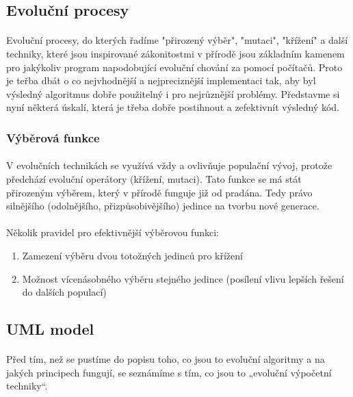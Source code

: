 \documentclass[bc,male,java,dept460]{diploma}		%
\begin{document}
\subsection{Evoluční procesy}
\paragraph*{}
Evoluční procesy, do kterých řadíme "přirozený výběr", "mutaci", "křížení" a další techniky, které jsou inspirované zákonitostmi v přírodě jsou základním kamenem pro jakýkoliv program napodobující evoluční chování za pomocí počítačů. Proto je teřba dbát o co nejvhodnější a nejpreciznější implementaci tak, aby byl výsledný algoritmus dobře použitelný i pro nejrůznější problémy. Představme si nyní některá úskalí, která je třeba dobře postihnout a zefektivnít výsledný kód.

\subsubsection{Výběrová funkce}
\paragraph*{}
V evolučních technikách se využívá vždy a ovlivňuje populační vývoj, protože předchází evoluční operátory (křížení, mutaci). Tato funkce se má stát přirozeným výběrem, který v přírodě funguje již od pradána. Tedy právo silnějšího (odolnějšího, přizpůsobivějšího) jedince na tvorbu nové generace.

\paragraph*{}
Několik pravidel pro efektivnější výběrovou funkci:
\begin{enumerate}
\item Zamezení výběru dvou totožných jedinců pro křížení
\item Možnost vícenásobného výběru stejného jedince (posílení vlivu lepších řešení do dalších populací)
\end{enumerate}

\subsection{UML model}
\paragraph*{}
Před tím, než se pustíme do popisu toho, co jsou to evoluční algoritmy a na jakých principech fungují, se seznámíme s tím, co jsou to „evoluční výpočetní techniky“.
\end{document}
